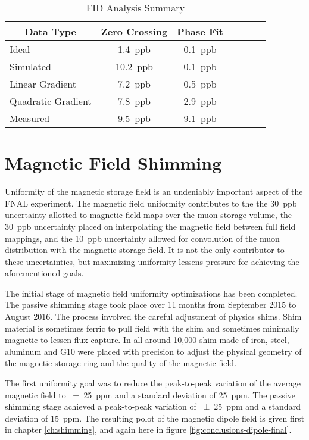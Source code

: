 \begin{table}[h]
\label{tab:conclusion-fid-summary}
\caption{FID Analysis Summary}
\centering
\begin{tabular}{l c c c c c c}
    \hline
    \multicolumn{1}{c}{Data Type} & Zero Crossing & Phase Fit \\
    \hline
    Ideal                & \SI{1.4}{ppb}  & \SI{0.1}{ppb} \\
    Simulated            & \SI{10.2}{ppb} & \SI{0.1}{ppb} \\
    Linear Gradient      & \SI{7.2}{ppb}  & \SI{0.5}{ppb} \\
    Quadratic Gradient   & \SI{7.8}{ppb}  & \SI{2.9}{ppb} \\
    Measured             & \SI{9.5}{ppb}  & \SI{9.1}{ppb} \\
    \hline
\end{tabular}
\end{table}

\section{Magnetic Field Shimming}

Uniformity of the magnetic storage field is an undeniably important aspect of the FNAL \mugmtwo experiment.  The magnetic field uniformity contributes to the the \SI{30}{ppb} uncertainty allotted to magnetic field maps over the muon storage volume, the \SI{30}{ppb} uncertainty placed on interpolating the magnetic field between full field mappings, and the \SI{10}{ppb} uncertainty allowed for convolution of the muon distribution with the magnetic storage field. It is not the only contributor to these uncertainties, but maximizing uniformity lessens pressure for achieving the aforementioned goals.

The initial stage of magnetic field uniformity optimizations has been completed.  The passive shimming stage took place over 11 months from September 2015 to August 2016.  The process involved the careful adjustment of physics shims.  Shim material is sometimes ferric to pull field with the shim and sometimes minimally magnetic to lessen flux capture.  In all around 10,000 shim made of iron, steel, aluminum and G10 were placed with precision to adjust the physical geometry of the magnetic storage ring and the quality of the magnetic field.

The first uniformity goal was to reduce the peak-to-peak variation of the average magnetic field to \SI{\pm 25}{ppm} and a standard deviation of \SI{25}{ppm}.  The passive shimming stage achieved a peak-to-peak variation of \SI{\pm 25}{ppm} and a standard deviation of \SI{15}{ppm}.  The resulting polot of the magnetic dipole field is given first in chapter \ref{ch:shimming}, and again here in figure \ref{fig:conclusions-dipole-final}.

